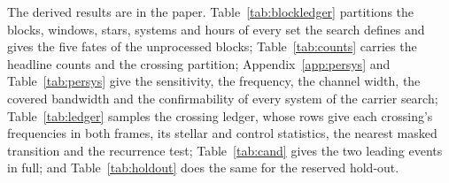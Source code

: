 The derived results are in the paper. Table~\ref{tab:blockledger} partitions
the blocks, windows, stars, systems and hours of every set the search defines
and gives the five fates of the unprocessed blocks;
Table~\ref{tab:counts} carries the headline counts and the crossing
partition; Appendix~\ref{app:persys} and
Table~\ref{tab:persys} give the sensitivity, the frequency, the channel
width, the covered bandwidth and the confirmability of every system of the
carrier search;
Table~\ref{tab:ledger} samples the crossing ledger, whose
\EvNCrossRaw{} rows give each crossing's frequencies in both frames, its
stellar and control statistics, the nearest masked transition and the
recurrence test;
Table~\ref{tab:cand} gives the two leading events in full; and
Table~\ref{tab:holdout} does the same for the reserved hold-out.

